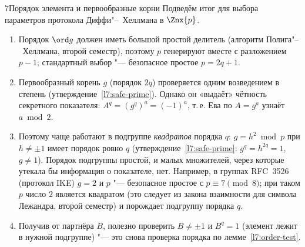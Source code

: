 \begin{lecture}{7}{Порядок элемента и первообразные корни}
Подведём итог для выбора параметров протокола Диффи"--~Хеллмана в $\Znx{p}$.
\begin{enumerate}
  \item Порядок $\ord g$ должен иметь большой простой делитель (алгоритм Полига"--~Хеллмана,
    второй семестр), поэтому $p$ генерируют вместе с разложением $p - 1$; стандартный выбор "---
    безопасное простое $p = 2q + 1$.
  \item Первообразный корень $g$ (порядок $2q$) проверяется одним возведением в степень
    (утверждение~\ref{l7:safe-prime}). Однако он «выдаёт» чётность секретного показателя:
    $A^q = (g^q)^a = (-1)^a$, т.\,е. Ева по $A = g^a$ узнаёт $a \bmod 2$.
  \item Поэтому чаще работают в подгруппе \emph{квадратов} порядка $q$: $g = h^2 \bmod p$ при
    $h \ne \pm 1$ имеет порядок ровно $q$ (утверждение~\ref{l7:safe-prime}: $g^q = h^{2q} = 1$,
    $g \ne 1$). Порядок подгруппы простой, и малых множителей, через которые утекала бы
    информация о показателе, нет. Например, в группах RFC~3526 (протокол IKE) $g = 2$ и $p$
    "--- безопасное простое с $p \equiv 7 \pmod 8$; при таком $p$ число $2$ является квадратом
    (это следует из закона взаимности для символа Лежандра, второй семестр) и порождает
    подгруппу порядка $q$.
  \item Получив от партнёра $B$, полезно проверить $B \ne \pm 1$ и $B^q = 1$ (элемент лежит в
    нужной подгруппе) "--- это снова проверка порядка по лемме~\ref{l7:order-test}.
\end{enumerate}


\checkyourselfsection

\begin{furtherreading}
\end{furtherreading}
\end{lecture}
